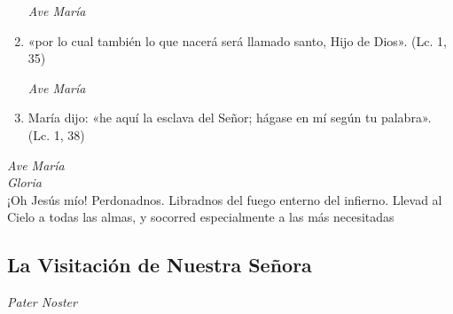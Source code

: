 \documentclass[a4paper,11pt, oneside]{report}
\begin{document}
\begin{enumerate}
        \textit{Ave María}

        \item «por lo cual también lo que nacerá será llamado santo, Hijo de Dios». (Lc. 1, 35)

        \textit{Ave María}

        \item María dijo: «he aquí la esclava del Señor; hágase en mí según tu palabra». (Lc. 1, 38)
        
      \end{enumerate}

      \textit{Ave María} \\
      \indent\textit{Gloria} \\
      \indent¡Oh Jesús mío! Perdonadnos. Libradnos del fuego enterno del infierno. Llevad al Cielo a todas las almas, y socorred especialmente a las más 
      necesitadas
            
    \subsection*{ La Visitación de Nuestra Señora }
      
      \textit{Pater Noster} 
\end{document}

